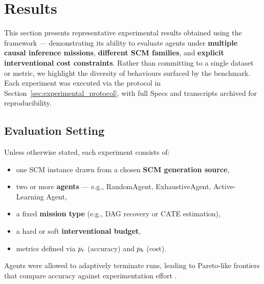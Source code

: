 \section{Results}
\label{sec:results}
This section presents representative experimental results obtained using the \game framework — demonstrating its ability to evaluate agents under \textbf{multiple causal inference missions}, \textbf{different SCM families}, and \textbf{explicit interventional cost constraints}.  
Rather than committing to a single dataset or metric, we highlight the diversity of behaviours surfaced by the benchmark. Each experiment was executed via the protocol in Section~\ref{sec:experimental_protocol}, with full Specs and transcripts archived for reproducibility.

\subsection{Evaluation Setting}
Unless otherwise stated, each experiment consists of:
\begin{itemize}
    \item one SCM instance drawn from a chosen \textbf{SCM generation source},
    \item two or more \textbf{agents} — e.g., RandomAgent, ExhaustiveAgent, Active-Learning Agent,
    \item a fixed \textbf{mission type} (e.g., DAG recovery or CATE estimation),
    \item a hard or soft \textbf{interventional budget},
    \item metrics defined via $p_r$ (accuracy) and $p_b$ (cost).
\end{itemize}
Agents were allowed to adaptively terminate runs, leading to Pareto-like frontiers that compare accuracy against experimentation effort \citep{BayesianCausalDiscovery2023}.

